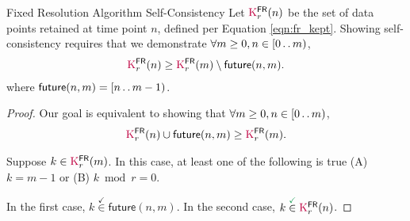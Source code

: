 \begin{theorem}{Fixed Resolution Algorithm Self-Consistency}
\label{thm:fixed-resolution-algo-self-consistency}
Let $\colorK^{\mathsf{FR}}_r(n)$ be the set of data points retained at time point $n$, defined per Equation \ref{eqn:fr_kept}.
Showing self-consistency requires that we demonstrate $\forall m \geq 0, n \in [0 \mathinner {\ldotp \ldotp} m)$,
\begin{align*}
\colorK^{\mathsf{FR}}_r(n)
\geq
\colorK^{\mathsf{FR}}_r(m)
\setminus
\mathsf{future}(n, m).
\end{align*}
where $\mathsf{future}(n, m) = [n \mathinner {\ldotp \ldotp} m - 1)$.
\end{theorem}

\begin{proof}
\label{prf:fixed-resolution-algo-self-consistency}
Our goal is equivalent to showing that $\forall m \geq 0, n \in [0 \mathinner {\ldotp \ldotp} m)$,
\begin{align*}
\colorK^{\mathsf{FR}}_r(n) \cup \mathsf{future}(n, m) \geq \colorK^{\mathsf{FR}}_r(m).
\end{align*}

Suppose $k \in \colorK^{\mathsf{FR}}_r(m)$.
In this case, at least one of the following is true (A) $k = m - 1$ or (B) $k \bmod r = 0$.

In the first case, $k \stackrel{\checkmark}{\in} \mathsf{future}(n, m)$.
In the second case, $k \stackrel{\checkmark}{\in} \colorK^{\mathsf{FR}}_r(n)$.
\end{proof}
